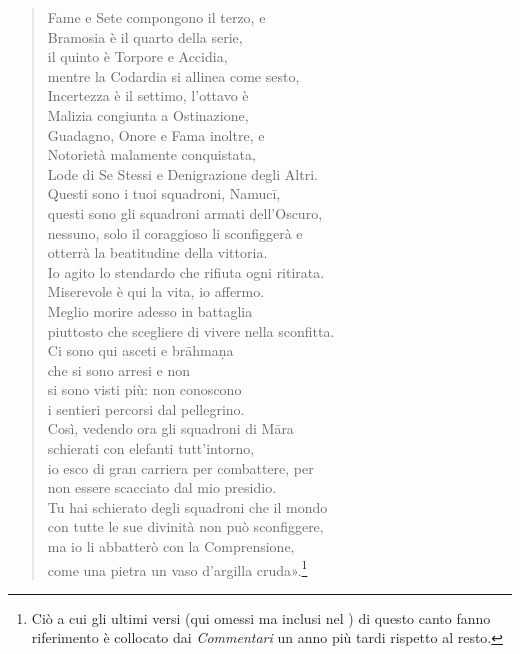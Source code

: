 \begin{quote}
Fame e Sete compongono il terzo, e \\
Bramosia è il quarto della serie, \\
il quinto è Torpore e Accidia, \\
mentre la Codardia si allinea come sesto, \\
Incertezza è il settimo, l’ottavo è \\
Malizia congiunta a Ostinazione, \\
Guadagno, Onore e Fama inoltre, e \\
Notorietà malamente conquistata, \\
Lode di Se Stessi e Denigrazione degli Altri. \\
Questi sono i tuoi squadroni, Namucī, \\
questi sono gli squadroni armati dell’Oscuro, \\
nessuno, solo il coraggioso li sconfiggerà e \\
otterrà la beatitudine della vittoria. \\
Io agito lo stendardo che rifiuta ogni ritirata. \\
Miserevole è qui la vita, io affermo. \\
Meglio morire adesso in battaglia \\
piuttosto che scegliere di vivere nella sconfitta. \\
Ci sono qui asceti e brāhmaṇa \\
che si sono arresi e non \\
si sono visti più: non conoscono \\
i sentieri percorsi dal pellegrino. \\
Così, vedendo ora gli squadroni di Māra \\
schierati con elefanti tutt’intorno, \\
io esco di gran carriera per combattere, per \\
non essere scacciato dal mio presidio. \\
Tu hai schierato degli squadroni che il mondo \\
con tutte le sue divinità non può sconfiggere, \\
ma io li abbatterò con la Comprensione, \\
come una pietra un vaso d’argilla cruda».\footnote{Ciò a cui gli ultimi versi (qui omessi ma inclusi nel \hyperlink{cap-04-La-diffusione-del-Dhamma#pag70A}{}) di questo canto fanno riferimento è collocato dai \emph{Commentari} un anno più tardi rispetto al resto.}
\end{quote}

